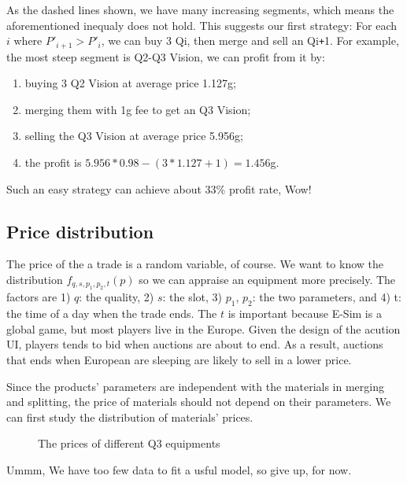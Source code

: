 \documentclass{manuscript}
\begin{document}
    As the dashed lines shown, we have many increasing segments, which means the aforementioned inequaly does not hold.
    This suggests our first strategy: For each $i$ where $P'_{i+1} > P'_i$, we can buy 3 Qi, then merge and sell an
    Qi\verb!+!1. For example, the most steep segment is Q2-Q3 Vision, we can profit from it by:
    \begin{enumerate}[nosep]
        \item buying 3 Q2 Vision at average price 1.127g;
        \item merging them with 1g fee to get an Q3 Vision;
        \item selling the Q3 Vision at average price 5.956g;
        \item the profit is $5.956 * 0.98 - (3 * 1.127 + 1) = 1.456$g.
    \end{enumerate}
    Such an easy strategy can achieve about 33\% profit rate, Wow!

    \subsection{Price distribution}

    The price of the a trade is a random variable, of course. We want to know the distribution $f_{q, s, p_1, p_2, t}(p)$ so
    we can appraise an equipment more precisely. The factors are 1) $q$: the quality, 2) $s$: the slot, 3) $p_1$, $p_2$:
    the two parameters, and 4) t: the time of a day when the trade ends. The $t$ is important because E-Sim is a global
    game, but most players live in the Europe. Given the design of the acution UI, players tends to bid when auctions are
    about to end. As a result, auctions that ends when European are sleeping are likely to sell in a lower price.

    Since the products' parameters are independent with the materials in merging and splitting, the price of materials
    should not depend on their parameters. We can first study the distribution of materials' prices.

    \begin{figure}[ht]
        \centering
        
        \caption{The prices of different Q3 equipments}\label{fig:hist_material_price}
    \end{figure}

    Ummm, We have too few data to fit a usful model, so give up, for now.
\end{document}
